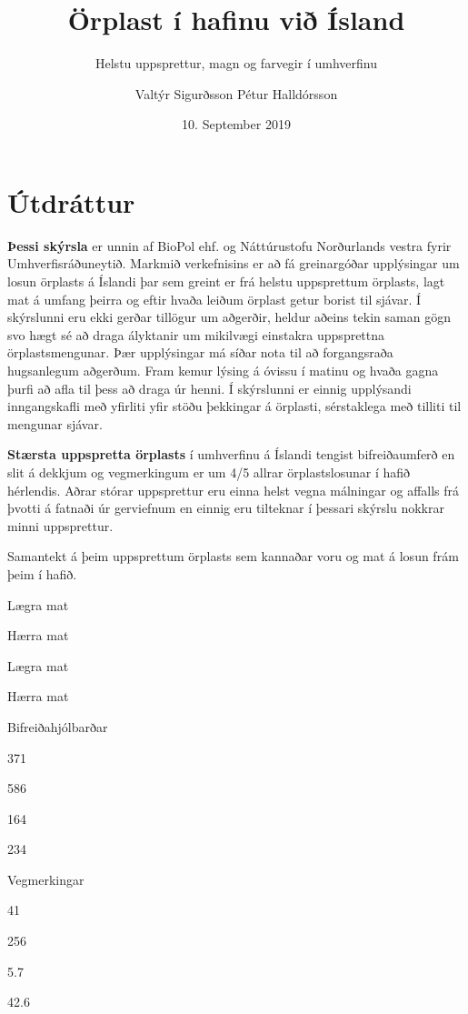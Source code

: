 \documentclass[icelandic,]{book}
\title{{Örplast í hafinu við Ísland}}
\subtitle{{ Helstu uppsprettur, magn og farvegir í umhverfinu}}
\author{{Valtýr Sigurðsson}
{Pétur Halldórsson}}
\date{10. September 2019}
\begin{document}
\maketitle

{
\setcounter{tocdepth}{1}
\tableofcontents
}
\listoftables
\listoffigures
\hypertarget{utdrattur}{%
\chapter*{Útdráttur}\label{utdrattur}}

\textbf{Þessi skýrsla} er unnin af BioPol ehf. og Náttúrustofu Norðurlands vestra fyrir Umhverfisráðuneytið. Markmið verkefnisins er að fá greinargóðar upplýsingar um losun örplasts á Íslandi þar sem greint er frá helstu uppsprettum örplasts, lagt mat á umfang þeirra og eftir hvaða leiðum örplast getur borist til sjávar. Í skýrslunni eru ekki gerðar tillögur um aðgerðir, heldur aðeins tekin saman gögn svo hægt sé að draga ályktanir um mikilvægi einstakra uppsprettna örplastsmengunar. Þær upplýsingar má síðar nota til að forgangsraða hugsanlegum aðgerðum. Fram kemur lýsing á óvissu í matinu og hvaða gagna þurfi að afla til þess að draga úr henni. Í skýrslunni er einnig upplýsandi inngangskafli með yfirliti yfir stöðu þekkingar á örplasti, sérstaklega með tilliti til mengunar sjávar.

\textbf{Stærsta uppspretta örplasts} í umhverfinu á Íslandi tengist bifreiðaumferð en slit á dekkjum og vegmerkingum er um 4/5 allrar örplastslosunar í hafið hérlendis. Aðrar stórar uppsprettur eru einna helst vegna málningar og affalls frá þvotti á fatnaði úr gerviefnum en einnig eru tilteknar í þessari skýrslu nokkrar minni uppsprettur.

\label{tab:smantekta}Samantekt á þeim uppsprettum örplasts sem kannaðar voru og mat á losun frám þeim í hafið.

Lægra mat

Hærra mat

Lægra mat

Hærra mat

Bifreiðahjólbarðar

371

586

164

234

Vegmerkingar

41

256

5.7

42.6
\end{document}
